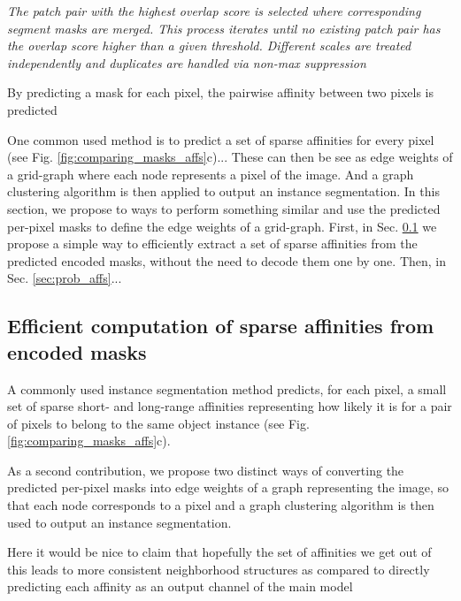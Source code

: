 \cite{liu2016multi} \emph{The patch pair with the highest overlap score is selected where corresponding segment masks are merged. This process iterates until no existing patch pair has the overlap score higher than a given threshold. Different scales are treated independently and duplicates are handled via non-max suppression}

By predicting a \maskname mask for each pixel, the pairwise affinity between two pixels is predicted 


One common used method is to predict a set of sparse affinities for every pixel (see Fig. \ref{fig:comparing_masks_affs}c)... 
These can then be see as edge weights of a grid-graph where each node represents a pixel of the image. And a graph clustering algorithm is then applied to output an instance segmentation.
In this section, we propose to ways to perform something similar and use the predicted per-pixel \maskname masks to define the edge weights of a grid-graph.
First, in Sec. \ref{sec:efficient_affs} we propose a simple way to efficiently extract a set of sparse affinities from the predicted encoded \maskname masks, without the need to decode them one by one. Then, in Sec. \ref{sec:prob_affs}...

\subsection{Efficient computation of sparse affinities from encoded masks}\label{sec:efficient_affs}
A commonly used instance segmentation method predicts, for each pixel, a small set of sparse short- and long-range affinities representing how likely it is for a pair of pixels to belong to the same object instance (see Fig. \ref{fig:comparing_masks_affs}c).



As a second contribution, we propose two distinct ways of converting the predicted per-pixel \maskname masks into edge weights of a graph representing the image, so that each node corresponds to a pixel and a graph clustering algorithm is then used to output an instance segmentation.

Here it would be nice to claim that hopefully the set of affinities we get out of this leads to more consistent neighborhood structures as compared to directly predicting each affinity as an output channel of the main model

